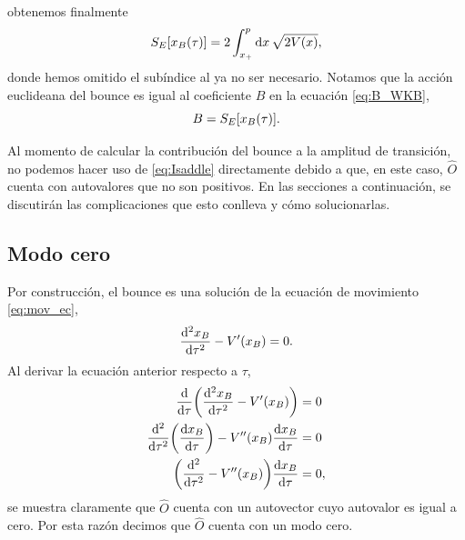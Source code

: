 obtenemos finalmente
\begin{equation}\label{eq:bounce4}
S_E\qty[x_B\qty(\tau)] = 2 \int_{x_+}^{p} \dd{x} \sqrt{2 V\qty(x)},
\end{equation}
donde hemos omitido el subíndice al ya no ser necesario. Notamos que la acción euclideana del bounce es igual al coeficiente $B$ en la ecuación \eqref{eq:B_WKB}, 
\begin{equation}
	B = S_E\qty[x_B\qty(\tau)].
\end{equation}

 
Al momento de calcular la contribución del bounce a la amplitud de transición, no podemos hacer uso de \eqref{eq:Isaddle} directamente debido a que, en este caso, $\hat{O}$ cuenta con autovalores que no son positivos. En las secciones a continuación, se discutirán las complicaciones que esto conlleva y cómo solucionarlas. 

\subsection{Modo cero} \label{sec:modo_zero}

Por construcción, el bounce es una solución de la ecuación de movimiento \eqref{eq:mov_ec},
\begin{equation}\label{eq:mov_ec_bounce}
\dv[2]{x_B}{\tau} - V' \qty(x_B) = 0.
\end{equation}
Al derivar la ecuación anterior respecto a $\tau$,
\begin{align}
	\dv{\tau}\qty(\dv[2]{x_B}{\tau} - V'\qty(x_B)) &= 0 \\
	\dv[2]{\tau}\qty(\dv{x_B}{\tau}) - V''\qty(x_B)\dv{x_B}{\tau} &= 0 \\
	\qty(\dv[2]{\tau} - V''\qty(x_B))\dv{x_B}{\tau} &= 0, \label{eq:eom_modo_cero}
\end{align}
se muestra claramente que $\hat{O}$ cuenta con un autovector cuyo autovalor es igual a cero. Por esta razón decimos que $\hat{O}$ cuenta con un modo cero.

